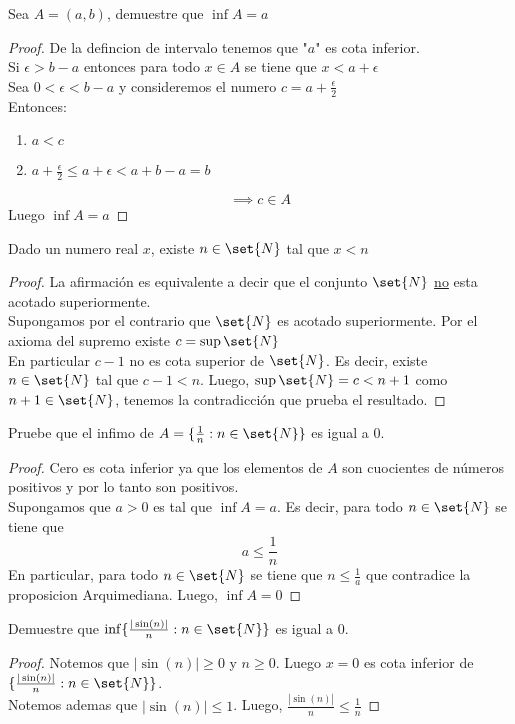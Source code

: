 \documentclass[11pt]{book}
\begin{document}
    \begin{ejm}
        Sea $A=(a,b)$, demuestre que $\inf A=a$
    \end{ejm}
    \begin{proof}
        De la defincion de intervalo tenemos que "$a$" es cota inferior.\\
        Si $\epsilon>b-a$ entonces para todo $x\in A$ se tiene que $x<a+\epsilon$\\
        Sea $0<\epsilon<b-a$ y consideremos el numero $c=a+\frac{\epsilon}{2}$\\
        Entonces:
        \begin{enumerate}
            \item $a<c$

            \item $a+\frac{\epsilon}{2}\leq a+\epsilon<a+b-a=b$
        \end{enumerate}
        \[\implies c\in A\]
        Luego $\inf A=a$
    \end{proof}
    \begin{prop}[Arquimediana]
        Dado un numero real $x$, existe $n\in\set{N}$ tal que $x<n$
    \end{prop}
    \begin{proof}
        La afirmación es equivalente a decir que el conjunto $\set{N}$ \underline{no} esta acotado superiormente.\\
        Supongamos por el contrario que $\set{N}$ es acotado superiormente. Por el axioma del supremo existe $c=\sup\set{N}$\\
        En particular $c-1$ no es cota superior de $\set{N}$. Es decir, existe $n\in\set{N}$ tal que $c-1<n$. Luego, $\sup\set{N}=c<n+1$ como $n+1\in\set{N}$, tenemos la contradicción que prueba el resultado.
    \end{proof}

    \begin{ejm}
        Pruebe que el infimo de $A=\{\frac{1}{n}:n\in\set{N}\}$ es igual a $0$.
    \end{ejm}
    \begin{proof}
        Cero es cota inferior ya que los elementos de $A$ son cuocientes de números positivos y por lo tanto son positivos.\\
        Supongamos que $a>0$ es tal que $\inf A=a$. Es decir, para todo $n\in\set{N}$ se tiene que
        \[a\leq\frac{1}{n}\]
        En particular, para todo $n\in\set{N}$ se tiene que $n\leq\frac{1}{a}$ que contradice la proposicion Arquimediana. Luego, $\inf A=0$
    \end{proof}

    \begin{ejm}
        Demuestre que $\inf\{\frac{|\sin(n)|}{n}:n\in\set{N}\}$ es igual a $0$.
    \end{ejm}

    \begin{proof}
        Notemos que $|\sin(n)|\geq 0$ y $n\geq0$. Luego $x=0$ es cota inferior de $\{\frac{|\sin(n)|}{n}:n\in\set{N}\}$.\\
        Notemos ademas que $|\sin(n)|\leq 1$. Luego, $\frac{|\sin(n)|}{n}\leq\frac{1}{n}$
    \end{proof}
\end{document}
